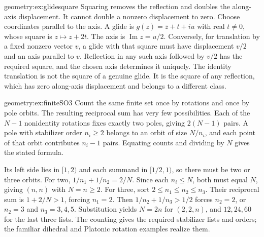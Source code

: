 \begin{solution}{geometry:ex:glidesquare}
\idea Squaring removes the reflection and doubles the along-axis displacement. It cannot double a nonzero displacement to zero.
\writeup Choose coordinates parallel to the axis. A glide is $g(z)=\bar z+t+iu$ with real $t\ne0$, whose square is $z\mapsto z+2t$. The axis is $\operatorname{Im}z=u/2$. Conversely, for translation by a fixed nonzero vector $v$, a glide with that square must have displacement $v/2$ and an axis parallel to $v$. Reflection in any such axis followed by $v/2$ has the required square, and the chosen axis determines it uniquely. The identity translation is not the square of a genuine glide. It is the square of any reflection, which has zero along-axis displacement and belongs to a different class.
\end{solution}

\begin{solution}{geometry:ex:finiteSO3}
\idea Count the same finite set once by rotations and once by pole orbits. The resulting reciprocal sum has very few possibilities.
\writeup Each of the $N-1$ nonidentity rotations fixes exactly two poles, giving $2(N-1)$ pairs. A pole with stabilizer order $n_i\ge2$ belongs to an orbit of size $N/n_i$, and each point of that orbit contributes $n_i-1$ pairs. Equating counts and dividing by $N$ gives the stated formula.

Its left side lies in $[1,2)$ and each summand in $[1/2,1)$, so there must be two or three orbits. For two, $1/n_1+1/n_2=2/N$. Since each $n_i\le N$, both must equal $N$, giving $(n,n)$ with $N=n\ge2$. For three, sort $2\le n_1\le n_2\le n_3$. Their reciprocal sum is $1+2/N>1$, forcing $n_1=2$. Then $1/n_2+1/n_3>1/2$ forces $n_2=2$, or $n_2=3$ and $n_3=3,4,5$. Substitution yields $N=2n$ for $(2,2,n)$, and $12,24,60$ for the last three lists. The counting gives the required stabilizer lists and orders; the familiar dihedral and Platonic rotation examples realize them.
\end{solution}

